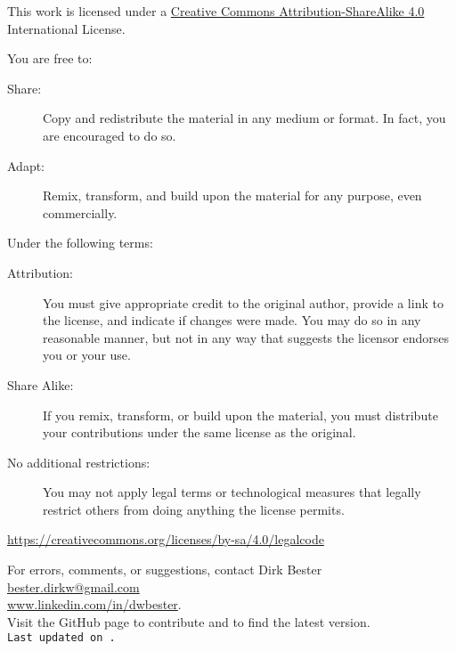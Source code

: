 \documentclass[a4paper]{article}
\begin{document}
\linenumbers
\renewcommand{\thepage}{\roman{page}}
\setcounter{page}{0}

\begin{titlepage}
\titleDB
\end{titlepage}



\begin{center}
This work is licensed under a
\href{http://creativecommons.org/licenses/by-sa/4.0/}{Creative Commons Attribution-ShareAlike 4.0}
\\ International License.
\end{center}


\begin{center}
You are free to:
\end{center}

\begin{description}
  \item[Share:] Copy and redistribute the material in any medium or format. In fact, you are encouraged to do so.
  \item[Adapt:] Remix, transform, and build upon the material
for any purpose, even commercially.
\end{description}

\begin{center}
Under the following terms:
\end{center}

\begin{description}
\item[Attribution:] You must give appropriate credit to the original author, provide a link to the license, and indicate if changes were made. You may do so in any reasonable manner, but not in any way that suggests the licensor endorses you or your use.

\item[Share Alike:] If you remix, transform, or build upon the material, you must distribute your contributions under the same license as the original.
\item[No additional restrictions:] You may not apply legal terms or technological measures that legally restrict others from doing anything the license permits.
\end{description}

\begin{center}
\url{https://creativecommons.org/licenses/by-sa/4.0/legalcode}
\end{center}

\vfill
\begin{center}
For errors, comments, or suggestions, contact Dirk Bester\\
\href{mailto:bester.dirkw@gmail.com}{bester.dirkw@gmail.com}\\
\href{https://www.linkedin.com/in/dwbester}{www.linkedin.com/in/dwbester}.\\
Visit the GitHub page to contribute and to find the latest version. \\
\texttt{Last updated on .} \\
\end{center}
\end{document}
